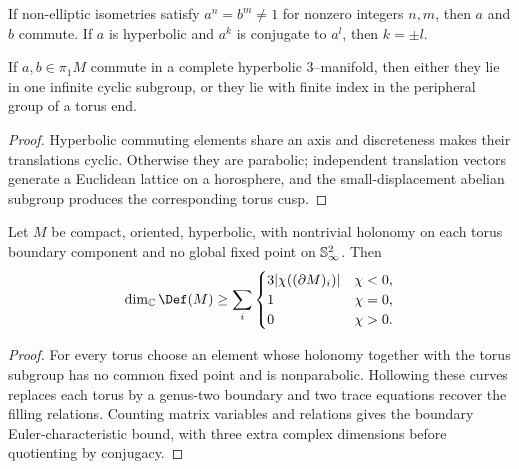 \begin{proposition}
\label{thurston-ch05-common-powers-commute}
If non-elliptic isometries satisfy $a^n=b^m\ne1$ for nonzero integers $n,m$, then $a$ and $b$ commute.  If $a$ is hyperbolic and $a^k$ is conjugate to $a^l$, then $k=\pm l$.
\end{proposition}

\begin{proposition}
\label{thurston-ch05-centralizer-dichotomy}
If $a,b\in\pi_1M$ commute in a complete hyperbolic $3$--manifold, then either they lie in one infinite cyclic subgroup, or they lie with finite index in the peripheral group of a torus end.
\end{proposition}
\begin{proof}\sketch Hyperbolic commuting elements share an axis and discreteness makes their translations cyclic.  Otherwise they are parabolic; independent translation vectors generate a Euclidean lattice on a horosphere, and the small-displacement abelian subgroup produces the corresponding torus cusp.\end{proof}

\begin{theorem}
\label{thurston-ch05-boundary-deformation-bound}
Let $M$ be compact, oriented, hyperbolic, with nontrivial holonomy on each torus boundary component and no global fixed point on $\mathbb{S}^2_\infty$.  Then
\[
\dim_\C\Def(M)\ge\sum_i\begin{cases}3\abs{\chi((\partial M)_i)}&\chi<0,\\1&\chi=0,\\0&\chi>0.\end{cases}
\]
\end{theorem}
\begin{proof}\sketch For every torus choose an element whose holonomy together with the torus subgroup has no common fixed point and is nonparabolic.  Hollowing these curves replaces each torus by a genus-two boundary and two trace equations recover the filling relations.  Counting matrix variables and relations gives the boundary Euler-characteristic bound, with three extra complex dimensions before quotienting by conjugacy.\end{proof}

